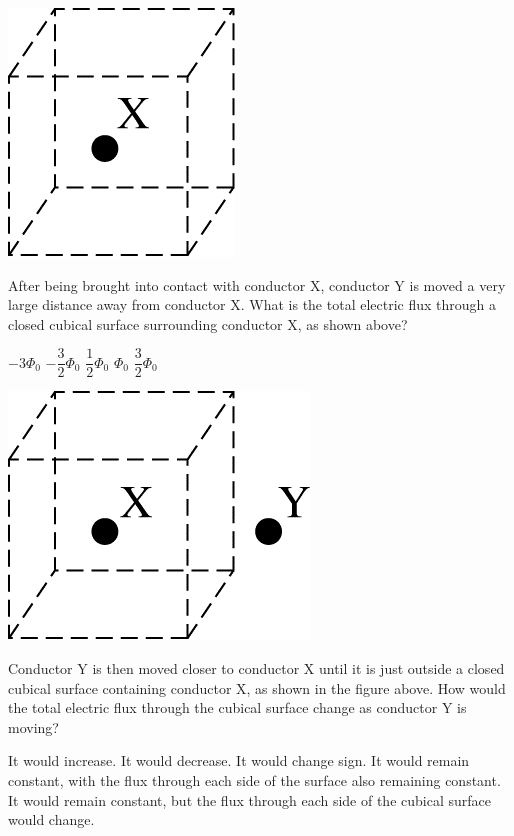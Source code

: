 \begin{center}
    \includegraphics[scale=0.3]{images/img-006-012.png}
\end{center}

\begin{questions}
\setcounter{question}{9}
\question
After being brought into contact with conductor X, conductor Y is moved a very large distance away from conductor X. What is the total electric flux through a closed cubical surface surrounding conductor X, as shown above?

\begin{oneparchoices}
    \choice $-3 \Phi_{0}$
    \choice $-\dfrac{3}{2} \Phi_{0}$
    \choice $ \dfrac{1}{2} \Phi_{0}$
    \choice $\Phi_{0}$
    \choice $ \dfrac{3}{2} \Phi_{0}$
\end{oneparchoices}
\end{questions}

\begin{center}
    \includegraphics[scale=0.3]{images/img-006-013.png}
\end{center}

\begin{questions}
\setcounter{question}{10}
\question
Conductor Y is then moved closer to conductor X until it is just outside a closed cubical surface containing conductor X, as shown in the figure above. How would the total electric flux through the cubical surface change as conductor Y is moving?

\begin{choices}
    \choice  It would increase.
    \choice  It would decrease.
    \choice  It would change sign.
    \choice  It would remain constant, with the flux through each side of the surface also remaining constant.
    \choice  It would remain constant, but the flux through each side of the cubical surface would change.
\end{choices}
\end{questions}
